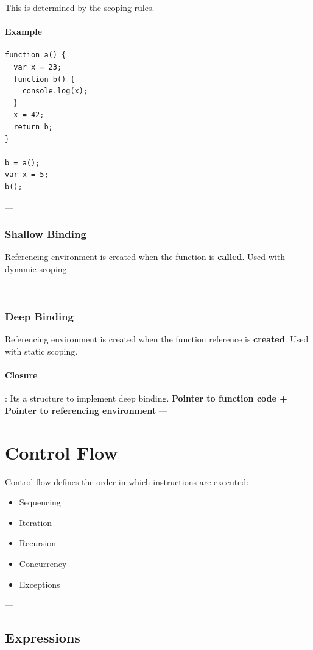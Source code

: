 \documentclass{article}
\begin{document}
This is determined by the scoping rules.

\paragraph{Example}
\begin{lstlisting}
function a() {
  var x = 23;
  function b() {
    console.log(x);
  }
  x = 42;
  return b;
}

b = a();
var x = 5;
b();
\end{lstlisting}

---

\subsubsection{Shallow Binding}
Referencing environment is created when the function is \textbf{called}.  
Used with dynamic scoping.

---

\subsubsection{Deep Binding}
Referencing environment is created when the function reference is \textbf{created}.  
Used with static scoping.

\paragraph{Closure}: Its a structure to implement deep binding. \textbf{Pointer to function code + Pointer to referencing environment}
---

\section{Control Flow}

Control flow defines the order in which instructions are executed:
\begin{itemize}
  \item Sequencing
  \item Iteration
  \item Recursion
  \item Concurrency
  \item Exceptions
\end{itemize}

---

\subsection{Expressions}
\end{document}
